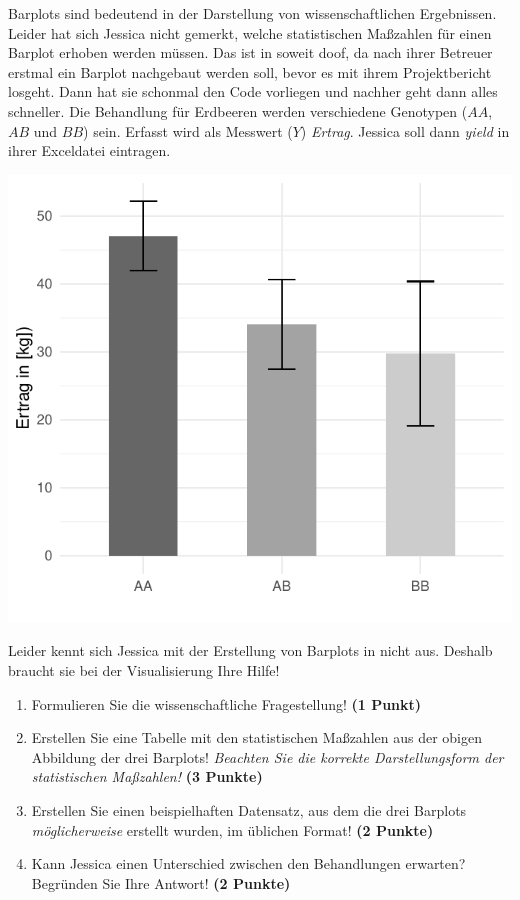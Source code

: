 \documentclass[a4paper, 9pt]{scrartcl}\usepackage[]{graphicx}\usepackage[]{xcolor}
\makeatletter
\def\maxwidth{ %
  \ifdim\Gin@nat@width>\linewidth
    \linewidth
  \else
    \Gin@nat@width
  \fi
}
\makeatother
\begin{document}
Barplots sind bedeutend in der Darstellung von wissenschaftlichen Ergebnissen. Leider hat sich Jessica nicht gemerkt, welche statistischen Maßzahlen für einen Barplot erhoben werden müssen. Das ist in soweit doof, da nach ihrer Betreuer erstmal ein Barplot nachgebaut werden soll, bevor es mit ihrem Projektbericht losgeht. Dann hat sie schonmal den \Rlogo Code vorliegen und nachher geht dann alles schneller. Die Behandlung für Erdbeeren werden verschiedene Genotypen ($AA$, $AB$ und $BB$) sein. Erfasst wird als Messwert ($Y$) \textit{Ertrag}. Jessica soll dann \textit{yield} in ihrer Exceldatei eintragen.



{\centering \includegraphics[width=\maxwidth]{img/barplot-02-1} 

}




Leider kennt sich Jessica mit der Erstellung von Barplots in \Rlogo nicht aus. Deshalb braucht sie bei der Visualisierung Ihre Hilfe!

\begin{enumerate}
\item Formulieren Sie die wissenschaftliche Fragestellung! \textbf{(1 Punkt)}
\item Erstellen Sie eine Tabelle mit den statistischen Maßzahlen aus der obigen Abbildung der drei Barplots! \textit{Beachten Sie die korrekte Darstellungsform der statistischen Maßzahlen!} \textbf{(3 Punkte)}
\item Erstellen Sie einen beispielhaften Datensatz, aus dem die drei Barplots \textit{möglicherweise} erstellt wurden, im \Rlogo üblichen Format! \textbf{(2 Punkte)}
\item Kann Jessica einen Unterschied zwischen den Behandlungen erwarten? Begründen Sie Ihre Antwort! \textbf{(2 Punkte)}
\end{enumerate} 
\clearpage
\end{document}
